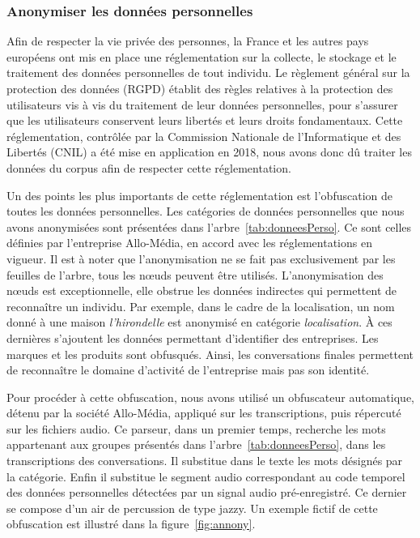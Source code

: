 \subsubsection{Anonymiser les données personnelles}



Afin de respecter la vie privée des personnes, la France et les autres pays européens ont mis en place une réglementation sur la collecte, le stockage et le traitement des données personnelles de tout individu. Le règlement général sur la protection des données (RGPD) établit des règles relatives à la protection des utilisateurs vis à vis du traitement de leur données personnelles, pour s'assurer que les utilisateurs conservent leurs libertés et leurs droits fondamentaux. Cette réglementation, contrôlée par la Commission Nationale de l'Informatique et des Libertés (CNIL) a été mise en application en 2018, nous avons donc dû traiter les données du corpus afin de respecter cette réglementation.

Un des points les plus importants de cette réglementation est l'obfuscation de toutes les données personnelles. Les catégories de données personnelles que nous avons anonymisées sont présentées dans l'arbre~\ref{tab:donneesPerso}. Ce sont celles définies par l'entreprise Allo-Média, en accord avec les réglementations en vigueur. Il est à noter que l'anonymisation ne se fait pas exclusivement par les feuilles de l'arbre, tous les nœuds peuvent être utilisés. L'anonymisation des nœuds est exceptionnelle, elle obstrue les données indirectes qui permettent de reconnaître un individu. Par exemple, dans le cadre de la localisation, un nom donné à une maison \textit{l'hirondelle} est anonymisé en catégorie \textit{localisation}. À ces dernières s'ajoutent les données permettant d'identifier des entreprises. Les marques et les produits sont obfusqués. Ainsi, les conversations finales permettent de reconnaître le domaine d'activité de l'entreprise mais pas son identité.



Pour procéder à cette obfuscation, nous avons utilisé un obfuscateur automatique, détenu par la société Allo-Média, appliqué sur les transcriptions, puis répercuté sur les fichiers audio. Ce parseur, dans un premier temps, recherche les mots appartenant aux groupes présentés dans l'arbre~\ref{tab:donneesPerso}, dans les transcriptions des conversations. Il substitue dans le texte les mots désignés par la catégorie. Enfin il substitue le segment audio correspondant au code temporel des données personnelles détectées par un signal audio pré-enregistré. Ce dernier se compose d'un air de percussion de type jazzy. Un exemple fictif de cette obfuscation est illustré dans la figure~\ref{fig:annony}.

